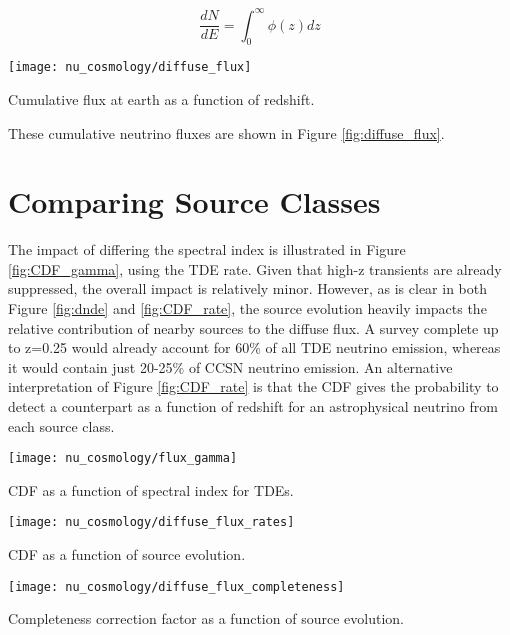 \begin{equation}
\frac{dN}{dE} = \int_{0}^{\infty} \phi(z) dz
\label{eq:nu_flux_tot}
\end{equation}

\begin{marginfigure}
	\centering \texttt{[image: nu\_cosmology/diffuse\_flux]}
	\caption{Cumulative flux at earth as a function of redshift.}
	\label{fig:diffuse_flux}
\end{marginfigure}

These cumulative neutrino fluxes are shown in Figure \ref{fig:diffuse_flux}. 

\section{Comparing Source Classes}

The impact of differing the spectral index is illustrated in Figure \ref{fig:CDF_gamma}, using the TDE rate. Given that high-z transients are already suppressed, the overall impact is relatively minor. However, as is clear in both Figure \ref{fig:dnde} and \ref{fig:CDF_rate}, the source evolution heavily impacts the relative contribution of nearby sources to the diffuse flux. A survey complete up to z=0.25 would already account for 60\% of all TDE neutrino emission, whereas it would contain just 20-25\% of CCSN neutrino emission. An alternative interpretation of Figure \ref{fig:CDF_rate} is that the CDF gives the probability to detect a counterpart as a function of redshift for an astrophysical neutrino from each source class.

\begin{marginfigure}
	\centering \texttt{[image: nu\_cosmology/flux\_gamma]}
	\caption{CDF as a function of spectral index for TDEs.}
	\label{fig:CDF_gamma}
\end{marginfigure}


\begin{marginfigure}
	\centering \texttt{[image: nu\_cosmology/diffuse\_flux\_rates]}
	\caption{CDF as a function of source evolution.}
	\label{fig:CDF_rate}
\end{marginfigure}

\begin{marginfigure}
	\centering \texttt{[image: nu\_cosmology/diffuse\_flux\_completeness]}
	\caption{Completeness correction factor as a function of source evolution.}
	\label{fig:completeness}
\end{marginfigure}

